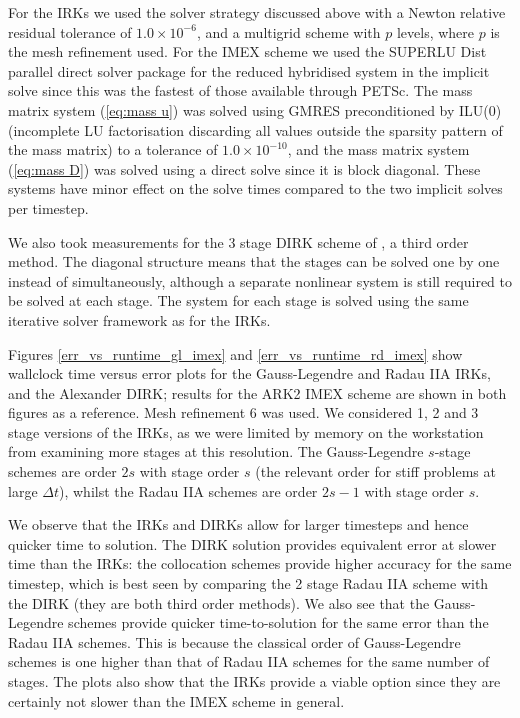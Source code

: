 \documentclass[a4paper, 12pt]{article}
\newcommand{\revisedA}[1]{#1}
\newcommand{\revisedus}[1]{#1}
\newcommand{\revisedC}[1]{{\color{blue}#1}}
\begin{document}
 For the IRKs we used the solver strategy discussed above with a
 Newton relative residual tolerance of $1.0\times 10^{-6}$,
 \revisedus{and a multigrid scheme with $p$ levels, where
   $p$ is the mesh refinement used.} For the
 IMEX scheme we used the SUPERLU Dist parallel direct solver package
 \citep{li2023newly,li2003superlu_dist} for the reduced hybridised
 system in the implicit solve since this was the fastest of those
 available through PETSc. The mass matrix system (\ref{eq:mass u}) was
 solved using GMRES preconditioned by ILU(0) (incomplete LU
 factorisation discarding all values outside the sparsity pattern of
 the mass matrix) \revisedus{to a tolerance of $1.0\times 10^{-10}$,
   and the mass matrix system (\ref{eq:mass D}) was solved using a
   direct solve since it is block diagonal. These systems have minor
   effect} on the solve times compared to the two implicit solves per
 timestep.

 \revisedA{We also took measurements for the 3 stage DIRK scheme of
   \citet{alexander1977diagonally}, a third order method.  The
   diagonal structure means that the stages can be solved one by one
   instead of simultaneously, although a separate nonlinear system
   is still required to be solved at each stage.
   The system for each stage is solved using
   the same iterative solver framework as for the IRKs.}
 
 Figures \ref{err_vs_runtime_gl_imex} and \ref{err_vs_runtime_rd_imex}
 show wallclock time versus error plots for the Gauss-Legendre and
 Radau IIA IRKs, and the Alexander DIRK; results for the ARK2 IMEX
 scheme are shown in both figures as a reference. Mesh refinement 6
 was used. We considered 1, 2 and 3 stage versions of the IRKs, as we
 were limited by memory on the workstation from examining more stages
 at this resolution. The Gauss-Legendre $s$-stage schemes are order
 $2s$ with stage order $s$ (the relevant order for stiff problems at
 large $\Delta t$), whilst the Radau IIA schemes are order $2s-1$ with
 stage order $s$.


\revisedA{We observe that the IRKs and DIRKs allow for larger timesteps and
 hence quicker time to solution. The DIRK solution provides equivalent
 error at slower time than the IRKs: the collocation schemes provide
 higher accuracy for the same timestep, which is best seen by
 comparing the 2 stage Radau IIA scheme with the DIRK (they are both
 third order methods). We also see that the Gauss-Legendre schemes
 provide quicker time-to-solution for the same error than the Radau
 IIA schemes.  This is because \revisedC{the classical order of
   Gauss-Legendre schemes is one higher than that of Radau IIA schemes
   for the same number of stages.}
 The
 plots also show that the IRKs provide a viable option since they are
 certainly not slower than the IMEX scheme in general.}
 
\end{document}

